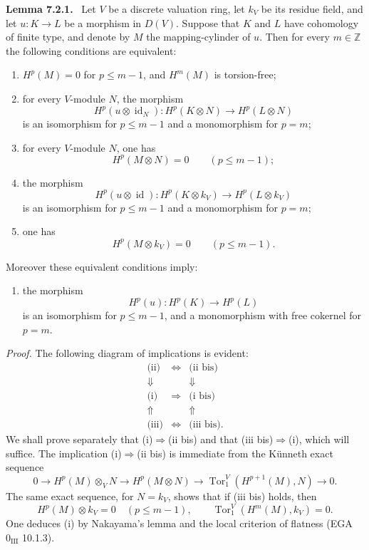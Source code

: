 \documentclass[11pt]{article}
\newenvironment{statement}[1]{\par\medskip\noindent\textbf{#1.}\ }{\par\medskip}
\begin{document}
\begin{statement}{Lemma 7.2.1}
Let $V$ be a discrete valuation ring, let $k_V$ be its residue field, and let $u:K\to L$ be a morphism in $D(V)$. Suppose that $K$ and $L$ have cohomology of finite type, and denote by $M$ the mapping-cylinder of $u$. Then for every $m\in\mathbb Z$ the following conditions are equivalent:
\begin{enumerate}[label=(\roman*)]
\item $H^p(M)=0$ for $p\le m-1$, and $H^m(M)$ is torsion-free;
\item for every $V$-module $N$, the morphism
\[
H^p(u\otimes\operatorname{id}_N):H^p(K\otimes N)\to H^p(L\otimes N)
\]
is an isomorphism for $p\le m-1$ and a monomorphism for $p=m$;
\item[(ii bis)] for every $V$-module $N$, one has
\[
H^p(M\otimes N)=0\qquad(p\le m-1);
\]
\item the morphism
\[
H^p(u\otimes\operatorname{id}):H^p(K\otimes k_V)\to H^p(L\otimes k_V)
\]
is an isomorphism for $p\le m-1$ and a monomorphism for $p=m$;
\item[(iii bis)] one has
\[
H^p(M\otimes k_V)=0\qquad(p\le m-1).
\]
\end{enumerate}
Moreover these equivalent conditions imply:
\begin{enumerate}[label=(\roman* bis)]
\item the morphism
\[
H^p(u):H^p(K)\to H^p(L)
\]
is an isomorphism for $p\le m-1$, and a monomorphism with free cokernel for $p=m$.
\end{enumerate}
\end{statement}

\emph{Proof.} The following diagram of implications is evident:
\[
\begin{array}{ccc}
\text{(ii)}&\Leftrightarrow&\text{(ii bis)}\\
\Downarrow&&\Downarrow\\
\text{(i)}&\Rightarrow&\text{(i bis)}\\
\Uparrow&&\Uparrow\\
\text{(iii)}&\Leftrightarrow&\text{(iii bis).}
\end{array}
\]
We shall prove separately that (i)$\Rightarrow$(ii bis) and that (iii bis)$\Rightarrow$(i), which will suffice. The implication (i)$\Rightarrow$(ii bis) is immediate from the Künneth exact sequence
\[
0\to H^p(M)\otimes_V N\to H^p(M\otimes N)\to \operatorname{Tor}_1^V(H^{p+1}(M),N)\to0.
\]
The same exact sequence, for $N=k_V$, shows that if (iii bis) holds, then
\[
H^p(M)\otimes k_V=0\quad(p\le m-1),\qquad
\operatorname{Tor}_1^V(H^m(M),k_V)=0.
\]
One deduces (i) by Nakayama's lemma and the local criterion of flatness (EGA $0_{\mathrm{III}}$ 10.1.3).
\end{document}
